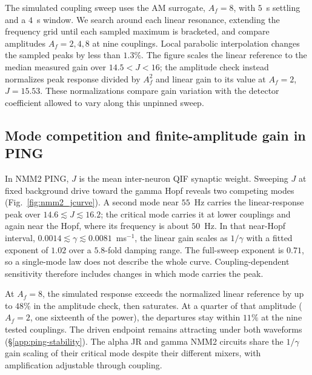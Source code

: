 \documentclass[11pt,a4paper]{article}
\newif\ifjne
\providecommand{\DIFaddtex}[1]{{\protect\color{blue} \sf #1}} %
\providecommand{\DIFadd}[1]{\texorpdfstring{\DIFaddtex{#1}}{#1}} %
\begin{document}
\DIFadd{The simulated coupling sweep uses the AM surrogate, $A_f=8$, with $5$~s
settling and a $4$~s window. We search around each linear resonance, extending
the frequency grid until each sampled maximum is bracketed, and compare
amplitudes $A_f=2,4,8$ at nine couplings. Local parabolic interpolation changes
the sampled peaks by less than $1.3\%$. The figure scales the linear reference
to the median measured gain over $14.5<J<16$; the amplitude check instead
normalizes peak response divided by $A_f^2$ and linear gain to its value at
$A_f=2$, $J=15.53$. These normalizations compare gain variation with the detector coefficient
allowed to vary along this unpinned sweep.
}


\fi

\ifjne
\subsection{\DIFadd{Mode competition and finite-amplitude gain in PING}}\label{supp:ping-coupling-results}
\DIFadd{In NMM2 PING, $J$ is the mean inter-neuron QIF synaptic weight.
Sweeping $J$ at fixed background drive toward the gamma Hopf reveals two
competing modes (Fig.~\ref{fig:nmm2_jcurve}). A second mode near $55$~Hz carries
the linear-response peak over $14.6\lesssim J\lesssim16.2$; the critical mode
carries it at lower couplings and again near the Hopf, where its frequency is
about $50$~Hz. In that near-Hopf interval,
$0.0014\lesssim\gamma\lesssim0.0081$~ms$^{-1}$, the linear gain scales as
$1/\gamma$ with a fitted exponent of $1.02$ over a $5.8$-fold damping range.
The full-sweep exponent is $0.71$, so a single-mode law does not describe the
whole curve. Coupling-dependent sensitivity \cite{clusella2023} therefore
includes changes in which mode carries the peak.
}

\DIFadd{At $A_f=8$, the simulated response exceeds the normalized linear reference by
up to $48\%$ in the amplitude check, then saturates. At a quarter of that
amplitude ($A_f=2$, one sixteenth of the power), the departures stay within
$11\%$ at the nine tested couplings. The driven endpoint remains attracting under both waveforms
(\S\ref{app:ping-stability}).
The alpha JR and gamma NMM2 circuits share the $1/\gamma$ gain scaling of their critical mode despite their different
mixers, with amplification adjustable through coupling.
}
\end{document}

